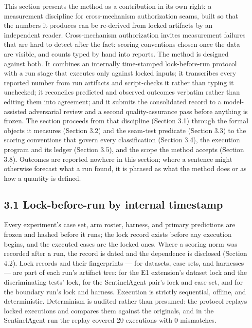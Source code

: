 \documentclass[
  10pt,
]{article}
\renewcommand{\_}{\allowbreak\origunderscore}
\begin{document}
This section presents the method as a contribution in its own right: a
measurement discipline for cross-mechanism authorization seams, built so
that the numbers it produces can be re-derived from locked artifacts by
an independent reader. Cross-mechanism authorization invites measurement
failures that are hard to detect after the fact: scoring conventions
chosen once the data are visible, and counts typed by hand into reports.
The method is designed against both. It combines an internally
time-stamped lock-before-run protocol with a run stage that executes
only against locked inputs; it transcribes every reported number from
run artifacts and script-checks it rather than typing it unchecked; it
reconciles predicted and observed outcomes verbatim rather than editing
them into agreement; and it submits the consolidated record to a
model-assisted adversarial review and a second quality-assurance pass
before anything is frozen. The section proceeds from that discipline
(Section 3.1) through the formal objects it measures (Section 3.2) and
the seam-test predicate (Section 3.3) to the scoring conventions that
govern every classification (Section 3.4), the execution program and its
ledger (Section 3.5), and the scope the method accepts (Section 3.8).
Outcomes are reported nowhere in this section; where a sentence might
otherwise forecast what a run found, it is phrased as what the method
does or as how a quantity is defined.

\subsection{3.1 Lock-before-run by internal
timestamp}\label{lock-before-run-by-internal-timestamp}

Every experiment's case set, arm roster, harness, and primary
predictions are frozen and hashed before it runs; the lock record exists
before any execution begins, and the executed cases are the locked ones.
Where a scoring norm was recorded after a run, the record is dated and
the dependence is disclosed (Section 4.2). Lock records and their
fingerprints --- for datasets, case sets, and harnesses --- are part of
each run's artifact tree: for the E1 extension's dataset lock and the
discriminating tests' lock, for the SentinelAgent pair's lock and case
set, and for the boundary run's lock and harness. Execution is strictly
sequential, offline, and deterministic. Determinism is audited rather
than presumed: the protocol replays locked executions and compares them
against the originals, and in the SentinelAgent run the replay covered
20 executions with 0 mismatches.
\end{document}

